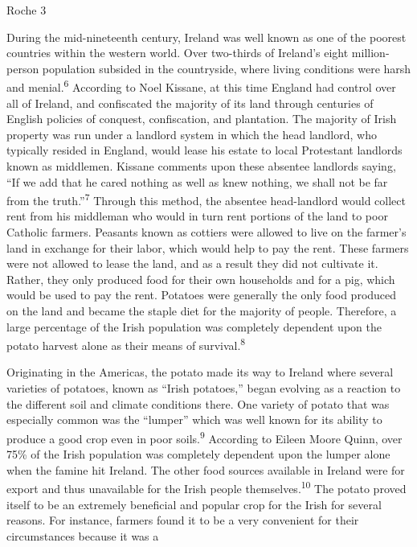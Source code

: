 \begin{Spacing}{1.5}
\newpage
\thispagestyle{empty}
\begin{flushright}Roche 3\end{flushright}

\hspace{.4in}During the mid-nineteenth century, Ireland was well known as one of the poorest countries within the western world. Over two-thirds of Ireland’s eight million-person population subsided in the countryside, where living conditions were harsh and menial.\textsuperscript{6} According to Noel Kissane, at this time England had control over all of Ireland, and confiscated the majority of its land through centuries of English policies of conquest, confiscation, and plantation. The majority of Irish property was run under a landlord system in which the head landlord, who typically resided in England, would lease his estate to local Protestant landlords known as middlemen. Kissane comments upon these absentee landlords saying, “If we add that he cared nothing as well as knew nothing, we shall not be far from the truth.”\textsuperscript{7}  Through this method, the absentee head-landlord would collect rent from his middleman who would in turn rent portions of the land to poor Catholic farmers. Peasants known as cottiers were allowed to live on the farmer’s land in exchange for their labor, which would help to pay the rent. These farmers were not allowed to lease the land, and as a result they did not cultivate it. Rather, they only produced food for their own households and for a pig, which would be used to pay the rent. Potatoes were generally the only food produced on the land and became the staple diet for the majority of people. Therefore, a large percentage of the Irish population was completely dependent upon the potato harvest alone as their means of survival.\textsuperscript{8} 

\hspace{.4in}Originating in the Americas, the potato made its way to Ireland where several varieties of potatoes, known as “Irish potatoes,” began evolving as a reaction to the different soil and climate conditions there. One variety of potato that was especially common was the “lumper” which was well known for its ability to produce a good crop even in poor soils.\textsuperscript{9}  According to Eileen Moore Quinn, over 75\% of the Irish population was completely dependent upon the lumper alone when the famine hit Ireland. The other food sources available in Ireland were for export and thus unavailable for the Irish people themselves.\textsuperscript{10}  The potato proved itself to be an extremely beneficial and popular crop for the Irish for several reasons. For instance, farmers found it to be a very convenient for their circumstances because it was a 


\end{Spacing}
